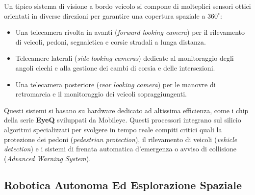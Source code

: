 ﻿\documentclass[11pt, a4paper]{article}
\begin{document}
Un tipico sistema di visione a bordo veicolo si compone di molteplici sensori ottici orientati in diverse direzioni per garantire una copertura spaziale a $360^\circ$:
\begin{itemize}[noitemsep]
    \item Una telecamera rivolta in avanti (\emph{forward looking camera}) per il rilevamento di veicoli, pedoni, segnaletica e corsie stradali a lunga distanza.
    \item Telecamere laterali (\emph{side looking cameras}) dedicate al monitoraggio degli angoli ciechi e alla gestione dei cambi di corsia e delle intersezioni.
    \item Una telecamera posteriore (\emph{rear looking camera}) per le manovre di retromarcia e il monitoraggio dei veicoli sopraggiungenti.
\end{itemize}


Questi sistemi si basano su hardware dedicato ad altissima efficienza, come i chip della serie \textbf{EyeQ} sviluppati da Mobileye. Questi processori integrano sul silicio algoritmi specializzati per svolgere in tempo reale compiti critici quali la protezione dei pedoni (\emph{pedestrian protection}), il rilevamento di veicoli (\emph{vehicle detection}) e i sistemi di frenata automatica d'emergenza o avviso di collisione (\emph{Advanced Warning System}).

\subsection{Robotica Autonoma Ed Esplorazione Spaziale}
\end{document}

